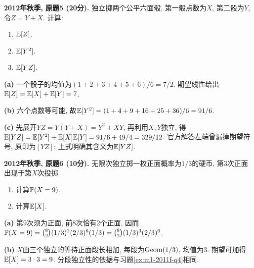 \begin{exercise}\label{ex:m1-2012f-q5}
\textbf{2012年秋季, 原题5 (20分).} 独立掷两个公平六面骰, 第一骰点数为$X$, 第二骰为$Y$, 令$Z=Y+X$. 计算:
\begin{enumerate}\item[(a)]\label{ex:m1-2012f-q5-a} $\mathbb E[Z]$.\item[(b)]\label{ex:m1-2012f-q5-b} $\mathbb E[Y^2]$.\item[(c)]\label{ex:m1-2012f-q5-c} $\mathbb E[YZ]$.\end{enumerate}
\end{exercise}
\begin{solution}
\textbf{(a)}\label{sol:m1-2012f-q5-a} 一个骰子的均值为$(1+2+3+4+5+6)/6=7/2$. 期望线性给出$\mathbb E[Z]=\mathbb E[X]+\mathbb E[Y]=7$.

\textbf{(b)}\label{sol:m1-2012f-q5-b} 六个点数等可能, 故$\mathbb E[Y^2]=(1+4+9+16+25+36)/6=91/6$.

\textbf{(c)}\label{sol:m1-2012f-q5-c} 先展开$YZ=Y(Y+X)=Y^2+XY$, 再利用$X,Y$独立, 得$\mathbb E[YZ]=\mathbb E[Y^2]+\mathbb E[X]\mathbb E[Y]=91/6+49/4=329/12$. 官方解答左端曾漏掉期望符号, 原印为$[YZ]$; 上式明确其含义为$\mathbb E[YZ]$.
\end{solution}

\begin{exercise}\label{ex:m1-2012f-q6}
\textbf{2012年秋季, 原题6 (10分).} 无限次独立掷一枚正面概率为$1/3$的硬币, 第3次正面出现于第$X$次投掷.
\begin{enumerate}\item[(a)]\label{ex:m1-2012f-q6-a} 计算$\mathbb P(X=9)$.\item[(b)]\label{ex:m1-2012f-q6-b} 计算$\mathbb E[X]$.\end{enumerate}
\end{exercise}
\begin{solution}
\textbf{(a)}\label{sol:m1-2012f-q6-a} 第9次须为正面, 前8次恰有2个正面, 因而$\mathbb P(X=9)=\binom82(1/3)^2(2/3)^6(1/3)=\binom82(1/3)^3(2/3)^6$.

\textbf{(b)}\label{sol:m1-2012f-q6-b} $X$由三个独立的等待正面段长相加, 每段为$\operatorname{Geom}(1/3)$, 均值为3. 期望可加得$\mathbb E[X]=3\cdot3=9$. 分段独立性的依据与习题\ref{ex:m1-2011f-q4}相同.
\end{solution}


